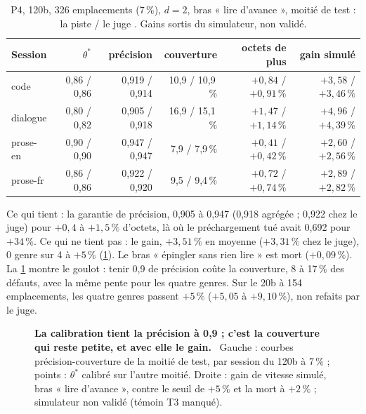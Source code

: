\begin{table}[tbp]
\centering\small
\caption[P4 : la piste et son juge]{P4, 120b, 326 emplacements (7\,\%), $d = 2$, bras « lire d'avance », moitié de test : la piste / le juge \mes. Gains sortis du simulateur, non validé.}
\label{t3mim:tab:p4}
\setlength{\tabcolsep}{4pt}
\begin{tabular}{@{}lrrrrr@{}}
\toprule
Session & $\theta^\ast$ & précision & couverture & octets de plus & gain simulé \\
\midrule
code & 0,86 / 0,86 & 0,919 / 0,914 & 10,9 / 10,9\,\% & $+0{,}84$ / $+0{,}91\,\%$ & $+3{,}58$ / $+3{,}46\,\%$ \\
dialogue & 0,80 / 0,82 & 0,905 / 0,918 & 16,9 / 15,1\,\% & $+1{,}47$ / $+1{,}14\,\%$ & $+4{,}96$ / $+4{,}39\,\%$ \\
prose-en & 0,90 / 0,90 & 0,947 / 0,947 & 7,9 / 7,9\,\% & $+0{,}41$ / $+0{,}42\,\%$ & $+2{,}60$ / $+2{,}56\,\%$ \\
prose-fr & 0,86 / 0,86 & 0,922 / 0,920 & 9,5 / 9,4\,\% & $+0{,}72$ / $+0{,}74\,\%$ & $+2{,}89$ / $+2{,}82\,\%$ \\
\bottomrule
\end{tabular}
\end{table}

Ce qui tient : la garantie de précision, 0,905 à 0,947 (0,918 agrégée ; 0,922 chez le juge) pour $+0{,}4$ à $+1{,}5\,\%$ d'octets, là où le préchargement tué avait 0,692 pour $+34\,\%$. Ce qui ne tient pas : le gain, $+3{,}51\,\%$ en moyenne ($+3{,}31\,\%$ chez le juge), 0 genre sur 4 à $+5\,\%$ (\cref{t3mim:tab:p4}). Le bras « épingler sans rien lire » est mort ($+0{,}09\,\%$). La \cref{fig:t3-mim-p4} montre le goulot : tenir 0,9 de précision coûte la couverture, 8 à 17\,\% des défauts, avec la même pente pour les quatre genres. Sur le 20b à 154 emplacements, les quatre genres passent $+5\,\%$ ($+5{,}05$ à $+9{,}10\,\%$), non refaits par le juge.

\begin{figure}[tbp]
\centering
{}
\caption[P4 : précision, couverture et gain simulé]{\textbf{La calibration tient la précision à 0,9 ; c'est la couverture qui reste petite, et avec elle le gain.} \mes~Gauche : courbes précision-couverture de la moitié de test, par session du 120b à 7\,\% ; points : $\theta^\ast$ calibré sur l'autre moitié. Droite : gain de vitesse simulé, bras « lire d'avance », contre le seuil de $+5\,\%$ et la mort à $+2\,\%$ ; simulateur non validé (témoin T3 manqué). \HorsStyle{}}
\label{fig:t3-mim-p4}
\end{figure}

